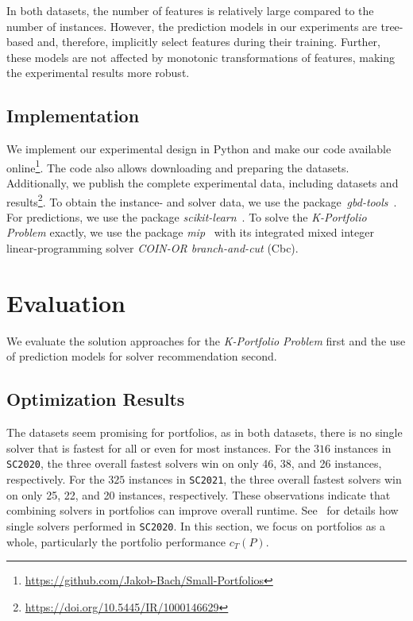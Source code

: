 \documentclass[a4paper,USenglish,pdfa]{lipics-v2021} %
\begin{document}
In both datasets, the number of features is relatively large compared to the number of instances.
However, the prediction models in our experiments are tree-based and, therefore, implicitly select features during their training.
Further, these models are not affected by monotonic transformations of features, making the experimental results more robust.

\subsection{Implementation}
\label{sec:experimental-design:impl}

We implement our experimental design in Python and make our code available online\footnote{\url{https://github.com/Jakob-Bach/Small-Portfolios}}.
The code also allows downloading and preparing the datasets.
Additionally, we publish the complete experimental data, including datasets and results\footnote{\url{https://doi.org/10.5445/IR/1000146629}}.
To obtain the instance- and solver data, we use the package~\emph{gbd-tools}~\cite{iser2020collaborative}.
For predictions, we use the package \emph{scikit-learn}~\cite{scikit-learn}.
To solve the \emph{K-Portfolio Problem} exactly, we use the package \emph{mip}~\cite{python-mip} with its integrated mixed integer linear-programming solver \emph{COIN-OR branch-and-cut} (Cbc).

\section{Evaluation}
\label{sec:evaluation}

We evaluate the solution approaches for the \emph{K-Portfolio Problem} first and the use of prediction models for solver recommendation second.

\subsection{Optimization Results}

The datasets seem promising for portfolios, as in both datasets, there is no single solver that is fastest for all or even for most instances.
For the $316$ instances in \texttt{SC2020}, the three overall fastest solvers win on only 46, 38, and 26 instances, respectively.
For the $325$ instances in \texttt{SC2021}, the three overall fastest solvers win on only 25, 22, and 20 instances, respectively.
These observations indicate that combining solvers in portfolios can improve overall runtime.
See~\cite{SC2020:AIJ} for details how single solvers performed in \texttt{SC2020}.
In this section, we focus on portfolios as a whole, particularly the portfolio performance $c_T(P)$.
\end{document}
